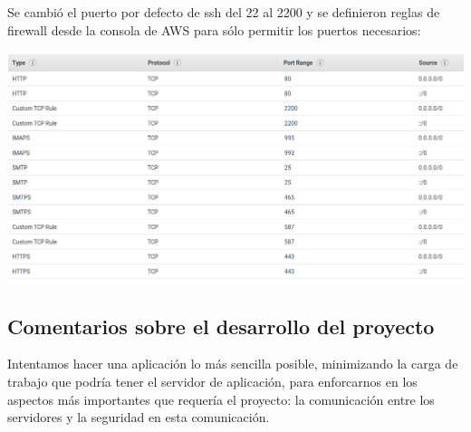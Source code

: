 \documentclass[9pt]{article}
\begin{document}
Se cambió el puerto por defecto de ssh del 22 al 2200 y se definieron reglas de firewall desde la consola de AWS para sólo permitir los puertos necesarios: \\
\begin{center}
\includegraphics[scale=0.3]{mail/03} \\
\end{center}

\newpage

\subsection*{Comentarios sobre el desarrollo del proyecto}
Intentamos hacer una aplicación lo más sencilla posible, minimizando la carga de trabajo que podría tener el servidor de aplicación, para enforcarnos en los aspectos más importantes que requería el proyecto: la comunicación entre los servidores y la seguridad en esta comunicación. %
\end{document}
